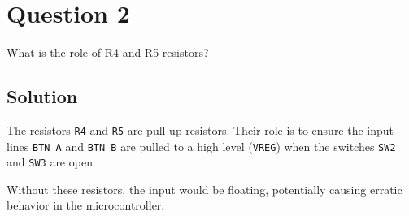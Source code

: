 \section*{Question 2}

What is the role of R4 and R5 resistors?

\subsection*{Solution}

The resistors \texttt{R4} and \texttt{R5} are \underline{pull-up resistors}.
Their role is to ensure the input lines \texttt{BTN\_A} and \texttt{BTN\_B} are pulled to a high level (\texttt{VREG}) when the switches \texttt{SW2} and \texttt{SW3} are open.

Without these resistors, the input would be floating, potentially causing erratic behavior in the microcontroller.
